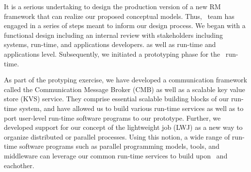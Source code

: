 It is a serious undertaking 
to design the production version of a new 
RM framework that can realize our proposed conceptual models.
Thus, \flux\ team has engaged in a series of steps
meant to inform our design process. 
We began with a functional design including an
internal review with stakeholders including 
systems, run-time, and applications developers.
as well as run-time and applications level.
Subsequently, we initiated a prototyping phase for the \flux\ run-time.


%
As part of the protyping exercise, we have developed a communication framework 
called the Communication Message Broker (CMB) 
as well as a scalable key value store (KVS) service.
They comprise essential scalable building blocks of our run-time system, 
and have allowed us to build various run-time services as well as
to port user-level run-time software programs to our prototype.
Further, we developed support for our concept of the lightweight 
job (LWJ) as a new way to organize distributed or parallel processes.
Using this notion, a wide range of run-time software
programs such as parallel programming models,
tools, and middleware can leverage our common run-time services 
to build upon \flux\ and eachother.

\ifcomments
{}
\fi
